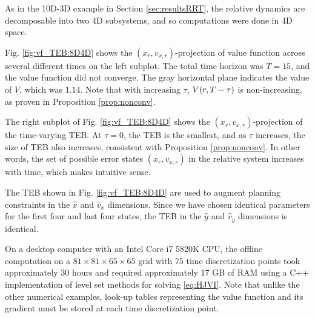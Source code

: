 As in the 10D-3D example in Section \ref{sec:resultsRRT}, the relative dynamics are decomposable into two 4D subsystems, and so computations were done in 4D space.

Fig. \ref{fig:vf_TEB:8D4D} shows the $(x_r, v_{x,r})$-projection of value function across several different times on the left subplot.
The total time horizon was $T=15$, and the value function did not converge.
The gray horizontal plane indicates the value of $\underline V$, which was $1.14$.
Note that with increasing $\tau$, $V(r,T-\tau)$ is non-increasing, as proven in Proposition \ref{prop:nonconv}.

The right subplot of Fig. \ref{fig:vf_TEB:8D4D} shows the $(x_r, v_{x,r})$-projection of the time-varying TEB.
At $\tau=0$, the TEB is the smallest, and as $\tau$ increases, the size of TEB also increases, consistent with Proposition \ref{prop:nonconv}.
In other words, the set of possible error states $(x_r, v_{x,r})$ in the relative system increases with time, which makes intuitive sense.

The TEB shown in Fig. \ref{fig:vf_TEB:8D4D} are used to augment planning constraints in the $\hat x$ and $\hat v_x$ dimensions.
Since we have chosen identical parameters for the first four and last four states, the TEB in the $\hat y$ and $\hat v_y$ dimensions is identical.

On a desktop computer with an Intel Core i7 5820K CPU, the offline computation on a $81\times81\times65\times65$ grid with $75$ time discretization points took approximately 30 hours and  required approximately 17 GB of RAM using a C++ implementation of level set methods for solving \eqref{eq:HJVI}.
Note that unlike the other numerical examples, look-up tables representing the value function and its gradient must be stored at each time discretization point.

